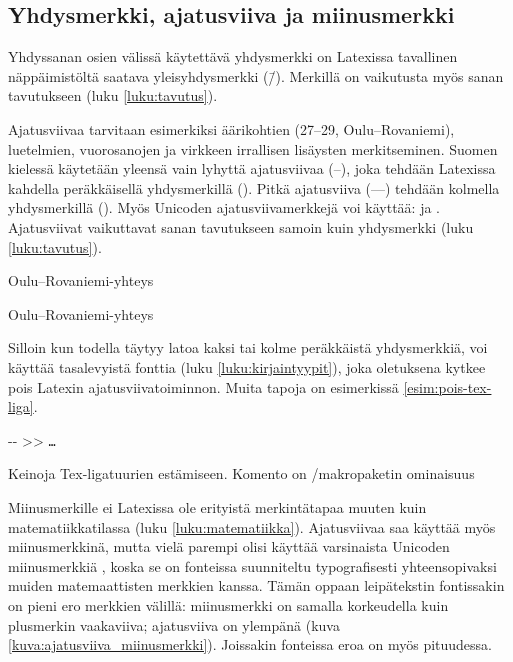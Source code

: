 \subsection{Yhdysmerkki, ajatusviiva ja miinusmerkki}

Yhdyssanan osien välissä käytettävä yhdysmerkki on Latexissa tavallinen
näppäimistöltä saatava yleis\-yh\-dys\-merk\-ki (\=/). Merkillä on
vaikutusta myös sanan tavutukseen (luku \ref{luku:tavutus}).

Ajatusviivaa tarvitaan esimerkiksi äärikohtien (27--29,
Oulu--Rova\-niemi), luetelmien, vuorosanojen ja virkkeen irrallisen
lisäysten merkitseminen. Suomen kielessä käytetään yleensä vain lyhyttä
ajatusviivaa \mbox{(--)}, joka tehdään Latexissa kahdella peräkkäisellä
yhdysmerkillä \mbox{(\koodi{--})}. Pitkä ajatusviiva \mbox{(---)}
tehdään kolmella yhdysmerkillä \mbox{(\koodi{---})}. Myös Unicoden
ajatusviivamerkkejä voi käyttää:  ja
. Ajatusviivat vaikuttavat sanan tavutukseen
samoin kuin yhdysmerkki (luku \ref{luku:tavutus}).

\pagebreak[3]

\begin{koodilohkosis}
  Oulu--Rovaniemi-yhteys
\end{koodilohkosis}

\begin{tulossis}
  Oulu--Rovaniemi-yhteys
\end{tulossis}

Silloin kun todella täytyy latoa kaksi tai kolme peräkkäistä
yhdysmerkkiä, voi käyttää tasalevyistä fonttia (luku
\ref{luku:kirjaintyypit}), joka oletuksena kytkee pois Latexin
ajatusviivatoiminnon. Muita tapoja on esimerkissä
\ref{esim:pois-tex-liga}.

\begin{esimerkki}
\begin{koodilohko}
  -{}-       %
  >{}>       %
  \texttt{…} %
\end{koodilohko}
\caption{Keinoja Tex-ligatuurien estämiseen. Komento  on \-/makropaketin ominaisuus}
\label{esim:pois-tex-liga}
\end{esimerkki}

Miinusmerkille ei Latexissa ole erityistä merkintätapaa muuten kuin
matematiikkatilassa (luku \ref{luku:matematiikka}). Ajatusviivaa saa
käyttää myös miinusmerkkinä, mutta vielä parempi olisi käyttää
varsinaista Unicoden miinusmerkkiä , koska
se on fonteissa suunniteltu typografisesti yhteensopivaksi muiden
matemaattisten merkkien kanssa. Tämän oppaan leipätekstin fontissakin on
pieni ero merkkien välillä: miinusmerkki on samalla korkeudella kuin
plusmerkin vaakaviiva; ajatusviiva on ylempänä (kuva
\ref{kuva:ajatusviiva_miinusmerkki}). Joissakin fonteissa eroa on myös
pituudessa.

